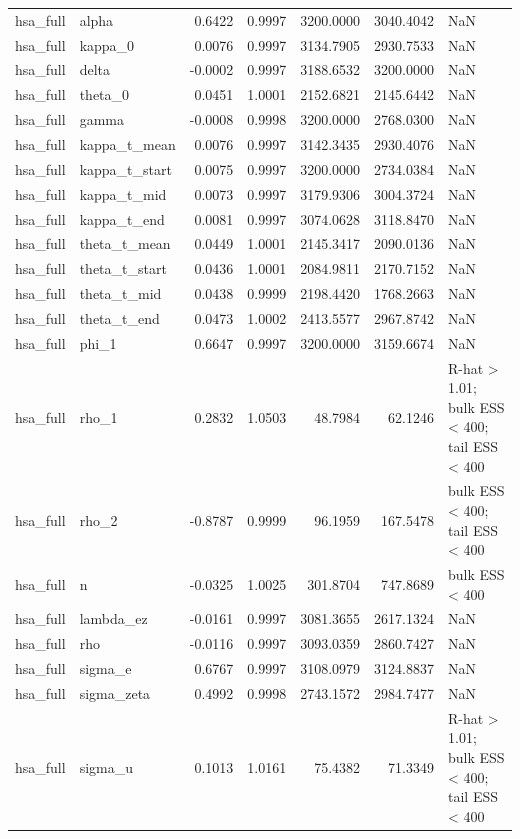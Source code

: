 \begin{tabular}{llrrrrl}
hsa\_full & alpha & 0.6422 & 0.9997 & 3200.0000 & 3040.4042 & NaN \\
hsa\_full & kappa\_0 & 0.0076 & 0.9997 & 3134.7905 & 2930.7533 & NaN \\
hsa\_full & delta & -0.0002 & 0.9997 & 3188.6532 & 3200.0000 & NaN \\
hsa\_full & theta\_0 & 0.0451 & 1.0001 & 2152.6821 & 2145.6442 & NaN \\
hsa\_full & gamma & -0.0008 & 0.9998 & 3200.0000 & 2768.0300 & NaN \\
hsa\_full & kappa\_t\_mean & 0.0076 & 0.9997 & 3142.3435 & 2930.4076 & NaN \\
hsa\_full & kappa\_t\_start & 0.0075 & 0.9997 & 3200.0000 & 2734.0384 & NaN \\
hsa\_full & kappa\_t\_mid & 0.0073 & 0.9997 & 3179.9306 & 3004.3724 & NaN \\
hsa\_full & kappa\_t\_end & 0.0081 & 0.9997 & 3074.0628 & 3118.8470 & NaN \\
hsa\_full & theta\_t\_mean & 0.0449 & 1.0001 & 2145.3417 & 2090.0136 & NaN \\
hsa\_full & theta\_t\_start & 0.0436 & 1.0001 & 2084.9811 & 2170.7152 & NaN \\
hsa\_full & theta\_t\_mid & 0.0438 & 0.9999 & 2198.4420 & 1768.2663 & NaN \\
hsa\_full & theta\_t\_end & 0.0473 & 1.0002 & 2413.5577 & 2967.8742 & NaN \\
hsa\_full & phi\_1 & 0.6647 & 0.9997 & 3200.0000 & 3159.6674 & NaN \\
hsa\_full & rho\_1 & 0.2832 & 1.0503 & 48.7984 & 62.1246 & R-hat > 1.01; bulk ESS < 400; tail ESS < 400 \\
hsa\_full & rho\_2 & -0.8787 & 0.9999 & 96.1959 & 167.5478 & bulk ESS < 400; tail ESS < 400 \\
hsa\_full & n & -0.0325 & 1.0025 & 301.8704 & 747.8689 & bulk ESS < 400 \\
hsa\_full & lambda\_ez & -0.0161 & 0.9997 & 3081.3655 & 2617.1324 & NaN \\
hsa\_full & rho & -0.0116 & 0.9997 & 3093.0359 & 2860.7427 & NaN \\
hsa\_full & sigma\_e & 0.6767 & 0.9997 & 3108.0979 & 3124.8837 & NaN \\
hsa\_full & sigma\_zeta & 0.4992 & 0.9998 & 2743.1572 & 2984.7477 & NaN \\
hsa\_full & sigma\_u & 0.1013 & 1.0161 & 75.4382 & 71.3349 & R-hat > 1.01; bulk ESS < 400; tail ESS < 400 \\

\end{tabular}
